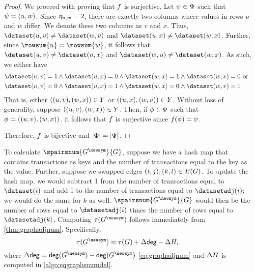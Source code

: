 \begin{proof}
  We proceed with proving that $f$ is surjective. Let $\psi_{}
  \in \Psi$ such that $\psi_{} = (u, w)$. Since $\eta_{u, w}
  = 2$, there are exactly two columns where values in rows $u$ and $w$ differ.
  We denote these two columns as $v$ and $x$. Thus, $\dataset(u, v) \neq
  \dataset(w, v)$ and $\dataset(u, x) \neq \dataset(w, x)$. Further, since
  $\rowsum{u} = \rowsum{w}$, it follows that $\dataset(u, v) \neq \dataset(u,
  x)$ and $\dataset(w, u) \neq \dataset(w, x)$. As such, we either have
  \begin{align*}
    \dataset(u, v) &= 1 \wedge \dataset(u, x) = 0 \wedge \dataset(w, x) = 1
    \wedge \dataset(w, v) = 0 \text{ or } \\
    \dataset(u, v) &= 0 \wedge \dataset(u, x) = 1 \wedge \dataset(w, x) = 0
    \wedge \dataset(w, v) = 1
  \end{align*}
  That is, either $((u, v), (w, x)) \in Y$ or $((u, x), (w, v)) \in
  Y$. Without loss of generality, suppose $((u, v), (w, x)) \in
  Y$. Then, if $\phi_{} \in \Phi$ such that
  $\phi_{} = ((u, v), (w, x))$, it follows that $f$ is
  surjective since $f(\phi_{}) = \psi_{}$.

  Therefore, $f$ is bijective and $|\Phi| = |\Psi|$.
\end{proof}

To calculate $\spairsnum{\graphadj}{\graph}$, suppose we have a hash map that
contains transactions as keys and the number of transactions equal to the key
as the value. Further, suppose we swapped edges $(i, j), (k, l) \in
E(G)$. To update the hash map, we would subtract 1 from the number of
transactions equal to $\dataset(i)$ and add 1 to the number of transactions
equal to $\datasetadj(i)$; we would do the same for $k$ as well.
$\spairsnum{\graphadj}{\graph}$ would then be the number of rows equal to
$\datasetadj(i)$ times the number of rows equal to $\datasetadj(k)$.
Computing $\graphadjnum{\graphadj}$ follows immediately from
\cref{thm:graphadjnum}. Specifically,
\begin{equation}
  \graphadjnum{\graphadj} = \graphadjnum{\graph} + \degreedel - \eqgraphsnumdel,
\end{equation}
where $\degreedel = \degree{\graphadj} - \degree{\graphadj}$
\cref{eq:graphadjnum} and $\Delta H$ is computed in
\cref{algo:eqgraphsnumdel}.

